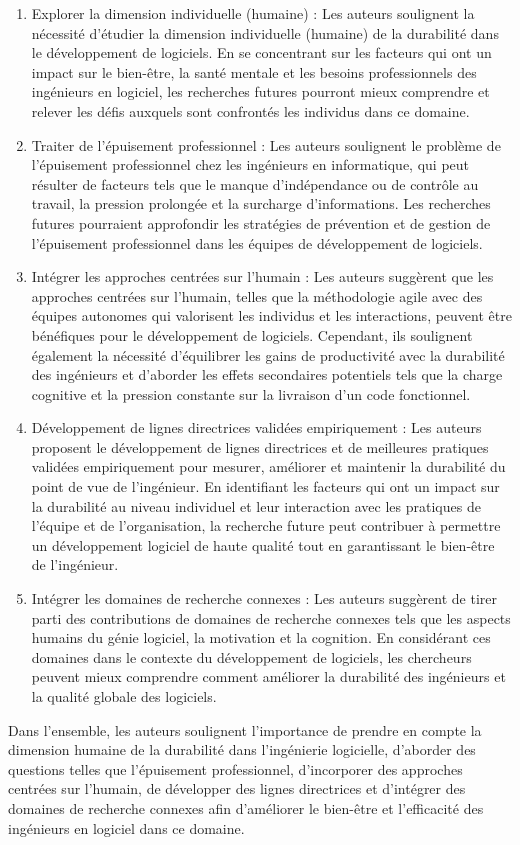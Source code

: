\begin{enumerate}
    \item Explorer la dimension individuelle (humaine) : Les auteurs soulignent la nécessité d'étudier la dimension individuelle (humaine) de la durabilité dans le développement de logiciels. En se concentrant sur les facteurs qui ont un impact sur le bien-être, la santé mentale et les besoins professionnels des ingénieurs en logiciel, les recherches futures pourront mieux comprendre et relever les défis auxquels sont confrontés les individus dans ce domaine.
    \item Traiter de l'épuisement professionnel : Les auteurs soulignent le problème de l'épuisement professionnel chez les ingénieurs en informatique, qui peut résulter de facteurs tels que le manque d'indépendance ou de contrôle au travail, la pression prolongée et la surcharge d'informations. Les recherches futures pourraient approfondir les stratégies de prévention et de gestion de l'épuisement professionnel dans les équipes de développement de logiciels.
    \item Intégrer les approches centrées sur l'humain : Les auteurs suggèrent que les approches centrées sur l'humain, telles que la méthodologie agile avec des équipes autonomes qui valorisent les individus et les interactions, peuvent être bénéfiques pour le développement de logiciels. Cependant, ils soulignent également la nécessité d'équilibrer les gains de productivité avec la durabilité des ingénieurs et d'aborder les effets secondaires potentiels tels que la charge cognitive et la pression constante sur la livraison d'un code fonctionnel.
    \item Développement de lignes directrices validées empiriquement : Les auteurs proposent le développement de lignes directrices et de meilleures pratiques validées empiriquement pour mesurer, améliorer et maintenir la durabilité du point de vue de l'ingénieur. En identifiant les facteurs qui ont un impact sur la durabilité au niveau individuel et leur interaction avec les pratiques de l'équipe et de l'organisation, la recherche future peut contribuer à permettre un développement logiciel de haute qualité tout en garantissant le bien-être de l'ingénieur.
    \item Intégrer les domaines de recherche connexes : Les auteurs suggèrent de tirer parti des contributions de domaines de recherche connexes tels que les aspects humains du génie logiciel, la motivation et la cognition. En considérant ces domaines dans le contexte du développement de logiciels, les chercheurs peuvent mieux comprendre comment améliorer la durabilité des ingénieurs et la qualité globale des logiciels.
\end{enumerate}
Dans l'ensemble, les auteurs soulignent l'importance de prendre en compte la dimension humaine de la durabilité dans l'ingénierie logicielle, d'aborder des questions telles que l'épuisement professionnel, d'incorporer des approches centrées sur l'humain, de développer des lignes directrices et d'intégrer des domaines de recherche connexes afin d'améliorer le bien-être et l'efficacité des ingénieurs en logiciel dans ce domaine.

